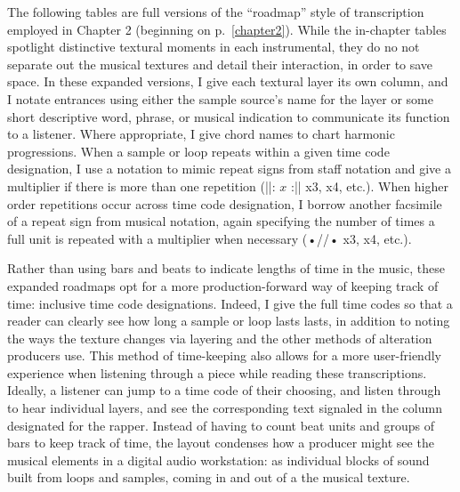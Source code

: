\appendix \label{appendix:fullroadmaps}
\renewcommand{\thetable}{A.\arabic{table}}
\setcounter{table}{0}

The following tables are full versions of the ``roadmap'' style of transcription employed in Chapter 2 (beginning on p.~\ref{chapter2}). While the in-chapter tables spotlight distinctive textural moments in each instrumental, they do no not separate out the musical textures and detail their interaction, in order to save space. In these expanded versions, I give each textural layer its own column, and I notate entrances using either the sample source's name for the layer or some short descriptive word, phrase, or musical indication to communicate its function to a listener. Where appropriate, I give chord names to chart harmonic progressions. When a sample or loop repeats within a given time code designation, I use a notation to mimic repeat signs from staff notation and give a multiplier if there is more than one repetition (||: $x$ :|| x3, x4, etc.). When higher order repetitions occur across time code designation, I borrow another facsimile of a repeat sign from musical notation, again specifying the number of times a full unit is repeated with a multiplier when necessary (•//• x3, x4, etc.).

Rather than using bars and beats to indicate lengths of time in the music, these expanded roadmaps opt for a more production-forward way of keeping track of time: inclusive time code designations. Indeed, I give the full time codes so that a reader can clearly see how long a sample or loop lasts lasts, in addition to noting the ways the texture changes via layering and the other methods of alteration producers use. This method of time-keeping also allows for a more user-friendly experience when listening through a piece while reading these transcriptions. Ideally, a listener can jump to a time code of their choosing, and listen through to hear individual layers, and see the corresponding text signaled in the column designated for the rapper. Instead of having to count beat units and groups of bars to keep track of time, the layout condenses how a producer might see the musical elements in a digital audio workstation: as individual blocks of sound built from loops and samples, coming in and out of a the musical texture.

